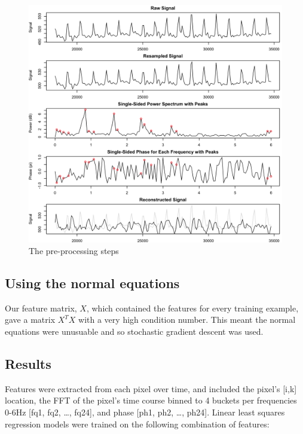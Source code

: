 \documentclass[12pt]{article}
\begin{document}
  \begin{figure}
    \captionsetup{justification=centering}
    \includegraphics[width=\textwidth]{images/fig1.png}
    \caption{The pre-processing steps \label{figure:preprocessing}}
  \end{figure}
  
 \subsection*{Using the normal equations}
 Our feature matrix, \(X\), which contained the features for every training example, gave a matrix $X^TX$ with a very high condition number. This meant the normal equations were unusuable and so stochastic gradient descent was used.
 
 \subsection*{Results}
 Features were extracted from each pixel over time, and included the pixel’s [i,k] location, the FFT of the pixel’s time course binned to 4 buckets per frequencies 0-6Hz [fq1, fq2, …, fq24], and phase [ph1, ph2, …, ph24]. Linear least squares regression models were trained on the following combination of features:\\
\end{document}
